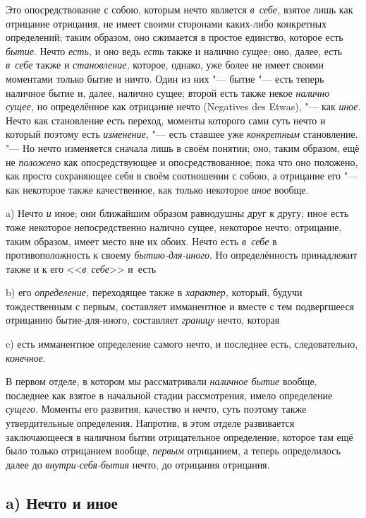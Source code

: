 Это опосредствование с собою, которым нечто является {\em в~себе,} взятое лишь
как отрицание отрицания, не имеет своими сторонами каких-либо конкретных
определений; таким образом, оно сжимается в простое единство, которое есть
{\em бытие}. Нечто {\em есть,} и оно ведь {\em есть} также и налично сущее;
оно, далее, есть {\em в~себе} также и {\em становление,} которое, однако, уже
более не имеет своими моментами только бытие и ничто. Один из них "--- бытие
"--- есть теперь наличное бытие и, далее, налично сущее; второй есть также
некое {\em налично сущее,} но определённое как отрицание нечто (Nega\-tives des
Etwas), "--- как {\em иное}. Нечто как становление есть переход, моменты
которого сами суть нечто и который поэтому есть {\em изменение,} "--- есть
ставшее уже {\em конкретным} становление. "--- Но нечто изменяется сначала лишь
в своём понятии; оно, таким образом, ещё не {\em положено} как опосредствующее
и опосредствованное; пока что оно положено, как просто сохраняющее себя в своём
соотношении с собою, а отрицание его "--- как некоторое также качественное, как
только некоторое {\em иное} вообще.


a) Нечто {\em и} иное; они ближайшим образом равнодушны друг к другу; иное есть
тоже некоторое непосредственно налично сущее, некоторое нечто; отрицание, таким
образом, имеет место вне их обоих. Нечто есть {\em в~себе} в противоположность
к своему {\em бытию-для-иного}. Но определённость принадлежит также и к его
<<{\em в~себе}>> и~есть

b) его {\em определение,} переходящее также в {\em характер,} который, будучи
тождественным с первым, составляет имманентное и вместе с тем подвергшееся
отрицанию бытие-для-иного, составляет {\em границу} нечто, которая

c) есть имманентное определение самого нечто, и последнее есть,
следовательно, {\em конечное}.

В первом отделе, в котором мы рассматривали {\em наличное бытие} вообще,
последнее как взятое в начальной стадии рассмотрения, имело определение
{\em сущего}. Моменты его развития, качество и нечто, суть поэтому также
утвердительные определения. Напротив, в этом отделе развивается заключающееся
в наличном бытии отрицательное определение, которое там ещё было только
отрицанием вообще, {\em первым} отрицанием, а теперь определилось далее до
{\em внутри-себя-бытия} нечто, до отрицания отрицания.

\subsection[a) Нечто и иное]{a) Нечто и иное}


